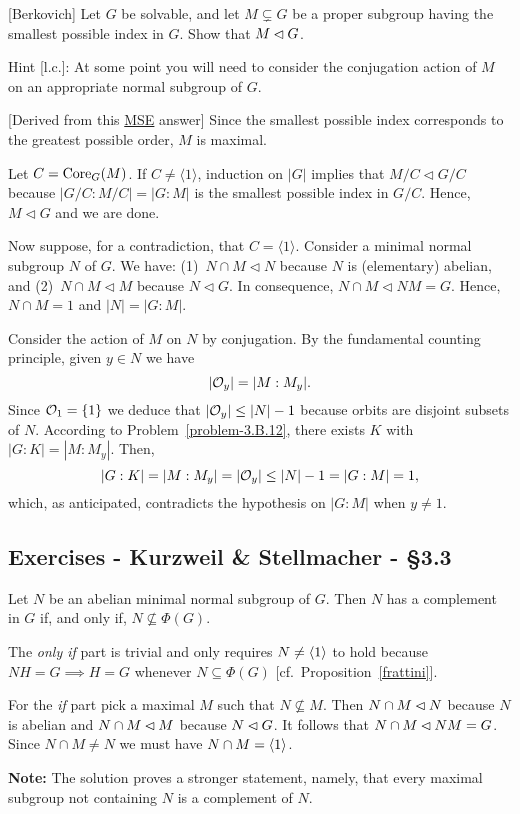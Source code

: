 \begin{probl}
    {\rm[Berkovich]} Let\/ $G$ be solvable, and let\/ $M\varsubsetneq G$ be a proper subgroup having the smallest possible index in\/ $G$. Show that\/ $M\lhd G$.

    \textrm{\rm Hint [l.c.]: At some point you will need to consider the conjugation action of $M$ on an appropriate normal subgroup of $G$.}
\end{probl}

\begin{solution} {[Derived from this \href{https://math.stackexchange.com/a/1383208/269050}{MSE} answer]} Since the smallest possible index corresponds to the greatest possible order, $M$ is maximal.

Let $C={\rm Core}_G(M)$. If $C\ne\langle1\rangle$, induction on $|G|$ implies that $M/C\triangleleft G/C$ because $|G/C:M/C|=|G:M|$ is the smallest possible index in $G/C$. Hence, $M\triangleleft G$ and we are done.

Now suppose, for a contradiction, that $C=\langle1\rangle$. Consider a minimal normal subgroup $N$ of $G$. We have: {\small(1)}~$N\cap M\triangleleft N$ because $N$ is (elementary) abelian, and {\small(2)}~$N\cap M\triangleleft M$ because $N\triangleleft G$. In consequence, $N\cap M\triangleleft NM=G$. Hence, $N\cap M=1$ and $|N|=|G:M|$.

Consider the action of $M$ on $N$ by conjugation. By the fundamental counting principle, given $y\in N$ we have
$$
    |{\cal O}_y| = |M:M_y|.
$$
Since ${\cal O}_1=\{1\}$ we deduce that $|{\cal O}_y|\le |N|-1$ because orbits are disjoint subsets of $N$. According to Problem~\ref{problem-3.B.12}, there exists $K$ with $|G:K|=|M:M_y|$. Then,
$$
    |G:K| = |M:M_y| = |{\cal O}_y| \le |N|-1 = |G:M|=1,
$$
which, as anticipated, contradicts the hypothesis on $|G:M|$ when $y\ne1$.  \end{solution}

\subsection{Exercises - Kurzweil \& Stellmacher - \S 3.3}

\begin{exr}
    Let\/ $N$ be an abelian minimal normal subgroup of\/ $G$. Then\/ $N$ has a complement in\/ $G$ if, and only if, $N \not\subseteq\Phi(G)$.
\end{exr}

\begin{solution} The \textit{only if\/} part is trivial and only requires $N\ne\langle1\rangle$ to hold because $NH=G\implies H=G$ whenever $N\subseteq\Phi(G)$ [cf.~Proposition~\ref{frattini}].

For the \textit{if\/} part pick a maximal $M$ such that $N\not\subseteq M$. Then $N\cap M\lhd N$ because $N$ is abelian and $N\cap M\lhd M$ because $N\lhd G$. It follows that $N\cap M\lhd NM=G$. Since $N\cap M\ne N$ we must have $N\cap M=\langle1\rangle$.

\textbf{Note:} The solution proves a stronger statement, namely, that every maximal subgroup not containing $N$ is a complement of $N$.  \end{solution}

